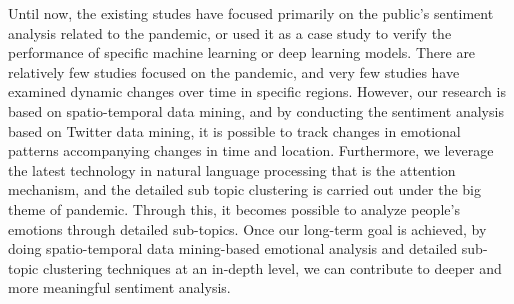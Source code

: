Until now, the existing studes have focused primarily on the public's
sentiment analysis related to the pandemic, or used it as a case study to
verify the performance of specific machine learning or deep learning models.
There are relatively few studies focused on the pandemic, and very few
studies have examined dynamic changes over time in specific regions. However,
our research is based on spatio-temporal data mining, and by conducting the
sentiment analysis based on Twitter data mining, it is possible to track
changes in emotional patterns accompanying changes in time and location.
Furthermore, we leverage the latest technology in natural language processing
that is the attention mechanism, and the detailed sub topic clustering is
carried out under the big theme of pandemic. Through this, it becomes
possible to analyze people's emotions through detailed sub-topics. Once our
long-term goal is achieved, by doing spatio-temporal data mining-based
emotional analysis and detailed sub-topic clustering techniques at an
in-depth level, we can contribute to deeper and more meaningful sentiment
analysis. 